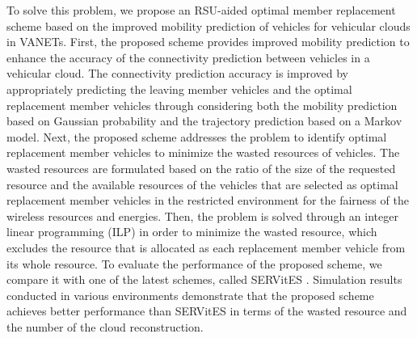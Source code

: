 \documentclass[electronics,aricle,accept,pdftex,moreauthors]{Definitions/mdpi}
\begin{document}
To solve this problem, we propose an RSU-aided optimal member replacement scheme based on the improved mobility prediction of vehicles for vehicular clouds in VANETs.
First, the proposed scheme provides improved mobility prediction to enhance the accuracy of the connectivity prediction between vehicles in a vehicular cloud.
The connectivity prediction accuracy is improved by appropriately predicting the leaving member vehicles and the optimal replacement member vehicles through considering both the mobility prediction based on Gaussian probability and the trajectory prediction based on a Markov model.
Next, the proposed scheme addresses the problem to identify optimal replacement member vehicles to minimize the wasted resources of vehicles.
The wasted resources are formulated based on the ratio of the size of the requested resource and the available resources of the vehicles that are selected as optimal replacement member vehicles in the restricted environment for the fairness of the wireless resources and energies.
Then, the problem is solved through an integer linear programming (ILP) in order to minimize the wasted resource, which excludes the resource that is allocated as each replacement member vehicle from its whole resource. 
To evaluate the performance of the proposed scheme, we compare it with one of the latest schemes, called SERVitES \cite{Meneguette2017j}.
Simulation results conducted in various environments demonstrate that the proposed scheme achieves better performance than SERVitES in terms of the wasted resource and the number of the cloud reconstruction.
\end{document}
